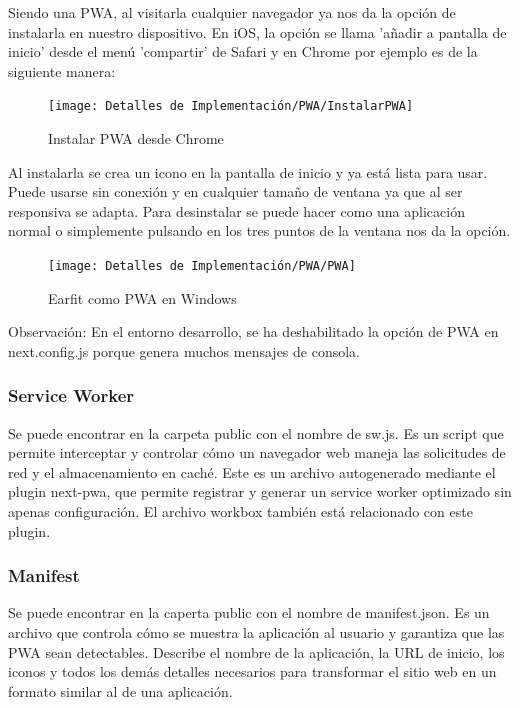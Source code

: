 \documentclass[12pt,twoside,titlepage]{report}
\begin{document}
Siendo una PWA, al visitarla cualquier navegador ya nos da la opción de instalarla en nuestro dispositivo. En iOS, la opción se llama 'añadir a pantalla de inicio' desde el menú 'compartir' de Safari y en Chrome por ejemplo es de la siguiente manera:

\begin{figure}[H]
    \centering
    \texttt{[image: Detalles de Implementación/PWA/InstalarPWA]}
    \label{fig:InstalarPWA}
    \caption{Instalar PWA desde Chrome}
\end{figure}

Al instalarla se crea un icono en la pantalla de inicio y ya está lista para usar. Puede usarse sin conexión y en cualquier tamaño de ventana ya que al ser responsiva se adapta. Para desinstalar se puede hacer como una aplicación normal o simplemente pulsando en los tres puntos de la ventana nos da la opción.

\begin{figure}[H]
    \centering
    \texttt{[image: Detalles de Implementación/PWA/PWA]}
    \label{fig:PWA}
    \caption{Earfit como PWA en Windows}
\end{figure}

Observación: En el entorno desarrollo, se ha deshabilitado la opción de PWA en next.config.js porque genera muchos mensajes de consola.

\subsubsection{Service Worker}
Se puede encontrar en la carpeta public con el nombre de sw.js. Es un script que permite interceptar y controlar cómo un navegador web maneja las solicitudes de red y el almacenamiento en caché. Este es un archivo autogenerado mediante el plugin next-pwa, que permite registrar y generar un service worker optimizado sin apenas configuración. El archivo workbox también está relacionado con este plugin.

\subsubsection{Manifest}
Se puede encontrar en la caperta public con el nombre de manifest.json. Es un archivo que controla cómo se muestra la aplicación al usuario y garantiza que las PWA sean detectables. Describe el nombre de la aplicación, la URL de inicio, los iconos y todos los demás detalles necesarios para transformar el sitio web en un formato similar al de una aplicación. 
\end{document}
